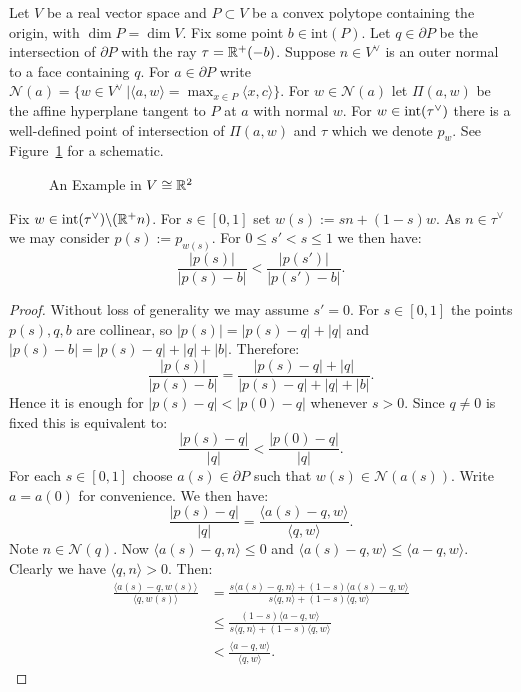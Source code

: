 Let \(V\) be a real vector space and \(P \subset V\) be a convex polytope containing the origin, with \(\dim P = \dim V\). Fix some point \(b \in \text{int}(P)\). Let \(q \in \partial P\) be the intersection of \(\partial P\) with the ray \(\tau = \mathbb{R}^+ (-b)\). Suppose \(n \in V^\vee\) is an outer normal to a face containing \(q\). For \(a \in \partial P\) write \(\mathcal{N}(a) = \{w\in V^\vee \ | \langle a,w \rangle = \max_{x \in P} \langle x,c \rangle \}\). For \(w \in \mathcal{N}(a) \) let \(\Pi(a,w)\) be the affine hyperplane tangent to \(P\) at \(a\) with normal \(w\). For \(w \in \text{int}(\tau^\vee) \) there is a well-defined point of intersection of \(\Pi(a,w)\) and \(\tau\) which we denote \(p_w\). See Figure~\ref{schematic} for a schematic.
\begin{figure}[h] \centering
{}
\caption{An Example in \(V \cong \mathbb{R}^2\)}
\label{schematic}
\end{figure}
\begin{lemma} \label{R(X):Lemma3.1}
Fix \(w \in \text{int}(\tau^\vee) \backslash (\mathbb{R}^+ n)\). For \(s \in [0,1]\) set \(w(s) := sn + (1-s)w\). As \(n \in \tau^\vee \) we may consider \(p(s) := p_{w(s)}\). For \(0 \le s' < s \le 1\) we then have:
\[
\frac{|p(s)|}{|p(s)-b|} < \frac{|p(s')|}{|p(s')-b|}.
\]
\end{lemma}
\begin{proof}
Without loss of generality we may assume \(s' = 0\). For \(s \in [0,1]\) the points \(p(s), q,b\) are collinear, so \(|p(s)|= |p(s)-q|+|q|\) and \(|p(s)-b| =|p(s)-q| +|q| + |b| \). Therefore:
\[
\frac{|p(s)|}{|p(s) - b|} = \frac{|p(s)-q|+|q|}{|p(s)-q| +|q| + |b|}.
\]
Hence it is enough for \(|p(s)-q| < |p(0)-q|\) whenever \(s >0\). Since \(q \neq 0\) is fixed this is equivalent to:
\[
\frac{|p(s) - q|}{|q|} < \frac{|p(0) - q|}{|q|}.
\]
For each \(s \in [0,1]\) choose \(a(s) \in \partial P\) such that \(w(s) \in \mathcal{N}(a(s))\). Write \(a = a(0)\) for convenience. We then have:
\[
\frac{|p(s)-q|}{|q|} = \frac{\langle a(s)-q, w \rangle }{\langle q,w \rangle}.
\]
Note \(n \in \mathcal{N}(q)\). Now \(\langle a(s)-q,n \rangle \le 0\)  and \( \langle a(s) - q,w \rangle \le \langle a - q,w \rangle\). Clearly we have \(\langle q , n \rangle > 0\). Then:
\begin{align*}
\frac{\langle a(s) - q, w(s) \rangle }{\langle q, w(s) \rangle} &= \frac{s\langle a(s)-q, n \rangle + (1-s)\langle a(s)-q,w \rangle}{s \langle q , n \rangle + (1-s) \langle q, w \rangle} \\ &\le \frac{(1-s)\langle a-q, w \rangle }{s \langle q , n \rangle + (1-s) \langle q, w \rangle} \\ &< \frac{\langle a-q, w \rangle }{\langle q,w \rangle}.
\end{align*}
\end{proof}
